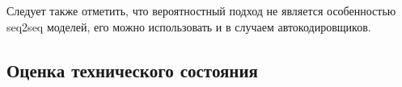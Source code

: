 \documentclass[12pt,a4paper]{article}
\begin{document}
Следует также отметить, что вероятностный подход не является особенностью seq2seq моделей, его можно использовать и в случаем автокодировщиков.


\newpage
\subsection{Оценка технического состояния}


%

%
%

\end{document}

